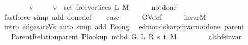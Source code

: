 \begin{isabellebody}
\isamarkupfalse%
\isanewline
\ \ \isamarkupfalse%
\ {}\isanewline
\ \ \isamarkupfalse%
\ v\ \isanewline
\ \ \ \ {\isachardoublequoteopen}v\ {\isasymin}\ set\ {\isacharparenleft}{\kern0pt}free{\isacharunderscore}{\kern0pt}vertices\ L\ M{\isacharparenright}{\kern0pt}{\isachardoublequoteclose}\isanewline
\ \ \ \ \isamarkupfalse%
\ not{\isacharunderscore}{\kern0pt}done{\isacharunderscore}{\kern0pt}{}\isanewline
\ \ \ \ \isamarkupfalse%
\ {\isacharparenleft}{\kern0pt}fastforce\ simp\ add{\isacharcolon}{\kern0pt}\ done{\isacharunderscore}{\kern0pt}{}{\isacharunderscore}{\kern0pt}def{\isacharparenright}{\kern0pt}\isanewline
\ \ \isamarkupfalse%
\ {\isacharquery}{\kern0pt}case\isanewline
\ \ \ \ \isamarkupfalse%
\ G{\isachardot}{\kern0pt}V{\isacharunderscore}{\kern0pt}def\isanewline
\ \ \ \ \isamarkupfalse%
\ invar{\isacharunderscore}{\kern0pt}M\isanewline
\ \ \ \ \isamarkupfalse%
\ {\isacharparenleft}{\kern0pt}intro\ edges{\isacharunderscore}{\kern0pt}are{\isacharunderscore}{\kern0pt}Vs{\isacharparenright}{\kern0pt}\ {\isacharparenleft}{\kern0pt}auto\ simp\ add{\isacharcolon}{\kern0pt}\ E{}{\isacharunderscore}{\kern0pt}cong{\isacharparenright}{\kern0pt}\isanewline
{}\isamarkupfalse%
%
\endisatagproof
{\isafoldproof}%
%
\isadelimproof
\isanewline
%
\endisadelimproof
%
\isadeliminvisible
\isanewline
%
\endisadeliminvisible
%
\isataginvisible
{}\isamarkupfalse%
\ {\isacharparenleft}{\kern0pt}\ edmonds{\isacharunderscore}{\kern0pt}karp{\isacharunderscore}{\kern0pt}invar{\isacharunderscore}{\kern0pt}not{\isacharunderscore}{\kern0pt}done{\isacharunderscore}{\kern0pt}{}{\isacharparenright}{\kern0pt}\ parent{\isacharcolon}{\kern0pt}\isanewline
\ \ \ {\isachardoublequoteopen}Parent{\isacharunderscore}{\kern0pt}Relation{\isachardot}{\kern0pt}parent\ {\isacharparenleft}{\kern0pt}P{\isacharunderscore}{\kern0pt}lookup\ {\isacharparenleft}{\kern0pt}m{\isacharunderscore}{\kern0pt}tbd\ G\ L\ R\ s\ t\ M{\isacharparenright}{\kern0pt}{\isacharparenright}{\kern0pt}{\isachardoublequoteclose}%
\endisataginvisible
{\isafoldinvisible}%
%
\isadeliminvisible
\isanewline
%
\endisadeliminvisible
%
\isadelimproof
%
\endisadelimproof
%
\isatagproof
{}\isamarkupfalse%
\ {\isacharminus}{\kern0pt}\isanewline
\ \ \isamarkupfalse%
\isanewline
\ \ \ \ {\isachardoublequoteopen}alt{\isacharunderscore}{\kern0pt}bfs{\isacharunderscore}{\kern0pt}invar{\isacharprime}{\kern0pt}\isanewline

\end{isabellebody}
